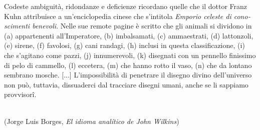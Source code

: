 \thispagestyle{empty}
\vspace*{\fill}
\begin{flushright}
  \begin{minipage}[t]{0.6\textwidth}
    \begin{italian}
      Codeste ambiguità, ridondanze e deficienze ricordano quelle che il dottor Franz Kuhn attribuisce a un'enciclopedia cinese che s'intitola \emph{Emporio celeste di conoscimenti benevoli}. Nelle sue remote pagine è scritto che gli animali si dividono in (a) appartenenti all'Imperatore, (b) imbalsamati, (c) ammaestrati, (d) lattonzoli, (e) sirene, (f) favolosi, (g) cani randagi, (h) inclusi in questa classificazione, (i) che s'agitano come pazzi, (j) innumerevoli, (k) disegnati con un pennello finissimo di pelo di cammello, (l) eccetera, (m) che hanno rotto il vaso, (n) che da lontano sembrano mosche. [...] L'impossibilità di penetrare il disegno divino dell'universo non può, tuttavia, dissuaderci dal tracciare disegni umani, anche se li sappiamo provvisor\^{i}.
    \end{italian}\\[\baselineskip]
    (Jorge Luis Borges, \textit{El idioma analítico de John Wilkins})
  \end{minipage}
\end{flushright}
\vspace*{\fill}
\cleardoublepage
